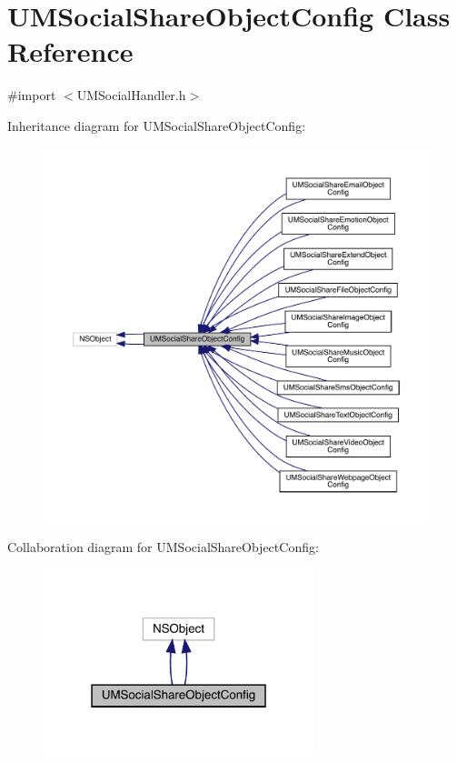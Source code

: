 \hypertarget{interface_u_m_social_share_object_config}{}\section{U\+M\+Social\+Share\+Object\+Config Class Reference}
\label{interface_u_m_social_share_object_config}


{\ttfamily \#import $<$U\+M\+Social\+Handler.\+h$>$}



Inheritance diagram for U\+M\+Social\+Share\+Object\+Config\+:\nopagebreak
\begin{figure}[H]
\begin{center}
\leavevmode
\includegraphics[width=350pt]{interface_u_m_social_share_object_config__inherit__graph}
\end{center}
\end{figure}


Collaboration diagram for U\+M\+Social\+Share\+Object\+Config\+:\nopagebreak
\begin{figure}[H]
\begin{center}
\leavevmode
\includegraphics[width=223pt]{interface_u_m_social_share_object_config__coll__graph}
\end{center}
\end{figure}
